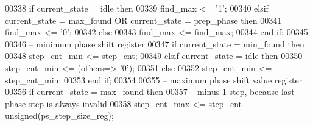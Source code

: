 \begin{DoxyCode}
00338       \textcolor{keywordflow}{if} \textcolor{vhdlchar}{current_state} \textcolor{vhdlchar}{=} \textcolor{vhdlchar}{idle} \textcolor{keywordflow}{then} 
00339          \textcolor{vhdlchar}{find_max} \textcolor{vhdlchar}{<=} \textcolor{vhdlchar}{'}\textcolor{vhdllogic}{}\textcolor{vhdllogic}{1}\textcolor{vhdlchar}{'};
00340       \textcolor{keywordflow}{elsif} \textcolor{vhdlchar}{current_state} \textcolor{vhdlchar}{=} \textcolor{vhdlchar}{max\_found} \textcolor{keywordflow}{OR} \textcolor{vhdlchar}{current_state} \textcolor{vhdlchar}{=} \textcolor{vhdlchar}{prep\_phase} \textcolor{keywordflow}{then} 
00341          \textcolor{vhdlchar}{find_max} \textcolor{vhdlchar}{<=} \textcolor{vhdlchar}{'}\textcolor{vhdllogic}{}\textcolor{vhdllogic}{0}\textcolor{vhdlchar}{'};
00342       \textcolor{keywordflow}{else} 
00343          \textcolor{vhdlchar}{find_max} \textcolor{vhdlchar}{<=} \textcolor{vhdlchar}{find_max};         
00344       \textcolor{keywordflow}{end} \textcolor{keywordflow}{if};
00345       
00346 \textcolor{keyword}{      -- minimum phase shift register}
00347       \textcolor{keywordflow}{if} \textcolor{vhdlchar}{current_state} \textcolor{vhdlchar}{=} \textcolor{vhdlchar}{min\_found} \textcolor{keywordflow}{then} 
00348          \textcolor{vhdlchar}{step_cnt_min} \textcolor{vhdlchar}{<=} \textcolor{vhdlchar}{step_cnt};
00349       \textcolor{keywordflow}{elsif} \textcolor{vhdlchar}{current_state} \textcolor{vhdlchar}{=} \textcolor{vhdlchar}{idle} \textcolor{keywordflow}{then} 
00350          \textcolor{vhdlchar}{step_cnt_min}   \textcolor{vhdlchar}{<=} \textcolor{vhdlchar}{(}\textcolor{keywordflow}{others}\textcolor{vhdlchar}{=}\textcolor{vhdlchar}{>} \textcolor{vhdlchar}{'}\textcolor{vhdllogic}{}\textcolor{vhdllogic}{0}\textcolor{vhdlchar}{'}\textcolor{vhdlchar}{)};
00351       \textcolor{keywordflow}{else} 
00352          \textcolor{vhdlchar}{step_cnt_min} \textcolor{vhdlchar}{<=} \textcolor{vhdlchar}{step_cnt_min};
00353       \textcolor{keywordflow}{end} \textcolor{keywordflow}{if};
00354       
00355 \textcolor{keyword}{      -- maximum phase shift value register}
00356       \textcolor{keywordflow}{if} \textcolor{vhdlchar}{current_state} \textcolor{vhdlchar}{=} \textcolor{vhdlchar}{max\_found} \textcolor{keywordflow}{then}
00357 \textcolor{keyword}{         -- minus 1 step, because last phase step is always invalid }
00358          \textcolor{vhdlchar}{step_cnt_max} \textcolor{vhdlchar}{<=} \textcolor{vhdlchar}{step_cnt} \textcolor{vhdlchar}{-} \textcolor{comment}{unsigned}\textcolor{vhdlchar}{(}\textcolor{vhdlchar}{ps_step_size_reg}\textcolor{vhdlchar}{)};

\end{DoxyCode}
